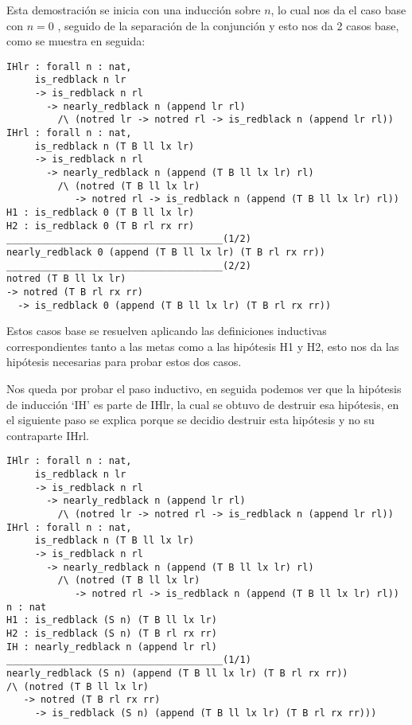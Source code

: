 Esta demostraci\'on se inicia con una inducci\'on sobre $n$, lo cual nos da el caso base con $n=0$
, seguido de la separaci\'on de la conjunci\'on y esto nos da 2 casos base, como se muestra en
seguida:

\begin{verbatim}
IHlr : forall n : nat,
     is_redblack n lr
     -> is_redblack n rl
       -> nearly_redblack n (append lr rl)
         /\ (notred lr -> notred rl -> is_redblack n (append lr rl))
IHrl : forall n : nat,
     is_redblack n (T B ll lx lr)
     -> is_redblack n rl
       -> nearly_redblack n (append (T B ll lx lr) rl)
         /\ (notred (T B ll lx lr)
            -> notred rl -> is_redblack n (append (T B ll lx lr) rl))
H1 : is_redblack 0 (T B ll lx lr)
H2 : is_redblack 0 (T B rl rx rr)
______________________________________(1/2)
nearly_redblack 0 (append (T B ll lx lr) (T B rl rx rr))
______________________________________(2/2)
notred (T B ll lx lr)
-> notred (T B rl rx rr)
  -> is_redblack 0 (append (T B ll lx lr) (T B rl rx rr))
\end{verbatim}

Estos casos base se resuelven aplicando las definiciones inductivas correspondientes tanto a las
metas como a las hip\'otesis H1 y H2, esto nos da las hipótesis necesarias para probar estos dos
casos.

Nos queda por probar el paso inductivo, en seguida podemos ver que la hipótesis de inducci\'on
`IH' es parte de IHlr, la cual se obtuvo de destruir esa hipótesis, en el siguiente paso se explica porque se decidio destruir esta hip\'otesis y no su contraparte IHrl.

\begin{verbatim}
IHlr : forall n : nat,
     is_redblack n lr
     -> is_redblack n rl
       -> nearly_redblack n (append lr rl)
         /\ (notred lr -> notred rl -> is_redblack n (append lr rl))
IHrl : forall n : nat,
     is_redblack n (T B ll lx lr)
     -> is_redblack n rl
       -> nearly_redblack n (append (T B ll lx lr) rl)
         /\ (notred (T B ll lx lr)
            -> notred rl -> is_redblack n (append (T B ll lx lr) rl))
n : nat
H1 : is_redblack (S n) (T B ll lx lr)
H2 : is_redblack (S n) (T B rl rx rr)
IH : nearly_redblack n (append lr rl)
______________________________________(1/1)
nearly_redblack (S n) (append (T B ll lx lr) (T B rl rx rr))
/\ (notred (T B ll lx lr)
   -> notred (T B rl rx rr)
     -> is_redblack (S n) (append (T B ll lx lr) (T B rl rx rr)))
\end{verbatim}

